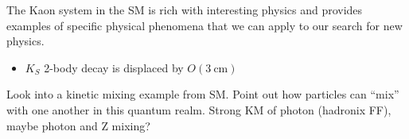 \begin{todoenv}
	The Kaon system in the SM is rich with interesting physics and provides examples of specific
	physical phenomena that we can apply to our search for new physics.

	\begin{itemize}
		\item \(K_S\) 2-body decay is displaced by $O(3~\text{cm})$
	\end{itemize}

	Look into a kinetic mixing example from SM. Point out how particles can ``mix'' with one another
	in this quantum realm. Strong KM of photon (hadronix FF), maybe photon and Z mixing?
\end{todoenv}

